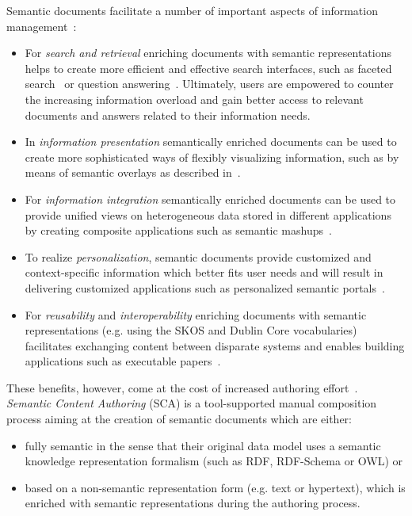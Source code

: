 \documentclass[10pt, conference, compsocconf]{IEEEtran}
\begin{document}
Semantic documents facilitate a number of important aspects of information management~\cite{rdface}:
\begin{itemize}
	\item For \emph{search and retrieval} enriching documents with semantic representations helps to create more efficient and effective search interfaces, such as faceted search~\cite{tunkenlang2009faceted} or question answering~\cite{Lopez2011}.
		Ultimately, users are empowered to counter the increasing information overload and gain better access to relevant documents and answers related to their information needs.
	\item In \emph{information presentation} semantically enriched documents can be used to create more sophisticated ways of flexibly visualizing information, such as by means of semantic overlays as described in~\cite{Burel2009}.
	\item For \emph{information integration} semantically enriched documents can be used to provide unified views on heterogeneous data stored in different applications by creating composite applications such as semantic mashups~\cite{Ankolekar2007}.
	\item To realize \emph{personalization}, semantic documents provide customized and context-specific information which better fits user needs and will result in delivering customized applications such as personalized semantic portals~\cite{ecs2007}.
	\item For \emph{reusability} and \emph{interoperability} enriching documents with semantic representations (e.g. using the SKOS and Dublin Core vocabularies) facilitates exchanging content between disparate systems and enables building applications such as executable papers~\cite{Muller2011}. \\
\end{itemize}

These benefits, however, come at the cost of increased authoring effort~\cite{hasida2007,uren2006}.
\emph{Semantic Content Authoring} (SCA) is a tool-supported manual composition process aiming at the creation of semantic documents which are either:
\begin{itemize}
	\item fully semantic in the sense that their original data model uses a semantic knowledge representation formalism (such as RDF, RDF-Schema or OWL) or
	\item based on a non-semantic representation form (e.g. text or hypertext), which is enriched with semantic representations during the authoring process.\\
\end{itemize}
\end{document}
